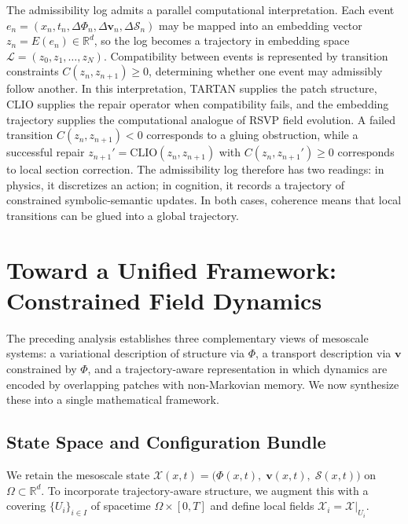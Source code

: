 \documentclass[11pt, a4paper, twocolumn]{article}
\newcommand{\X}{\mathcal{X}}
\newcommand{\Sfield}{\mathcal{S}}
\begin{document}
The admissibility log admits a parallel computational interpretation. Each
event $e_n = (x_n,t_n,\Delta\Phi_n,\Delta\mathbf{v}_n,\Delta\Sfield_n)$ may
be mapped into an embedding vector $z_n = E(e_n) \in \mathbb{R}^d$, so the
log becomes a trajectory in embedding space
$\mathcal{L} = (z_0,z_1,\ldots,z_N)$. Compatibility between events is
represented by transition constraints $C(z_n,z_{n+1}) \geq 0$, determining
whether one event may admissibly follow another. In this interpretation,
TARTAN supplies the patch structure, CLIO supplies the repair operator when
compatibility fails, and the embedding trajectory supplies the computational
analogue of RSVP field evolution. A failed transition $C(z_n,z_{n+1}) < 0$
corresponds to a gluing obstruction, while a successful repair
$z_{n+1}' = \mathrm{CLIO}(z_n,z_{n+1})$ with $C(z_n,z_{n+1}') \geq 0$
corresponds to local section correction. The admissibility log therefore has
two readings: in physics, it discretizes an action; in cognition, it records a
trajectory of constrained symbolic-semantic updates. In both cases, coherence
means that local transitions can be glued into a global trajectory.

\section{Toward a Unified Framework: Constrained Field Dynamics}

The preceding analysis establishes three complementary views of mesoscale
systems: a variational description of structure via $\Phi$, a transport
description via $\mathbf{v}$ constrained by $\Phi$, and a trajectory-aware
representation in which dynamics are encoded by overlapping patches with
non-Markovian memory. We now synthesize these into a single mathematical
framework.

\subsection{State Space and Configuration Bundle}

We retain the mesoscale state
$\X(x,t) = \bigl(\Phi(x,t),\; \mathbf{v}(x,t),\; \Sfield(x,t)\bigr)$
on $\Omega \subset \mathbb{R}^d$. To incorporate trajectory-aware structure,
we augment this with a covering $\{U_i\}_{i \in I}$ of spacetime
$\Omega \times [0,T]$ and define local fields $\X_i = \X|_{U_i}$.
\end{document}
